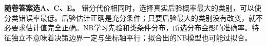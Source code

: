 \textbf{随卷答案选A、C、E。} 错分代价相同时，选择真实后验概率最大的类别，可以使分类错误率最低。后验估计正确是充分条件；只要后验最大的类别没有改变，就不必要求估计值完全正确。NB学习先验和类条件分布，所选分布会影响准确率。特征独立不意味着决策边界一定与坐标轴平行；拟合出的NB模型也可能过拟合。
